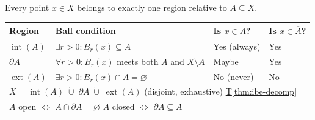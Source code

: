 \begin{tcolorbox}[colback=gray!6, colframe=gray!40, arc=2pt,
  left=8pt, right=8pt, top=6pt, bottom=6pt,
  title={\small\textbf{Part V \enspace Point Classification:
         Interior / Boundary / Exterior}},
  fonttitle=\small\bfseries]
\small
Every point $x \in X$ belongs to exactly one region relative to $A \subseteq X$.
\renewcommand{\arraystretch}{1.55}
\begin{tabular}{p{2.2cm} p{4.4cm} p{2.0cm} p{3.6cm}}
\toprule
\textbf{Region} & \textbf{Ball condition} & \textbf{Is $x \in A$?} & \textbf{Is $x \in \overline{A}$?} \\
\midrule

$\operatorname{int}(A)$
  & $\exists r > 0 : B_r(x) \subseteq A$
  & Yes (always)
  & Yes \\[2pt]

$\partial A$
  & $\forall r > 0 : B_r(x)$ meets both $A$ and $X \setminus A$
  & Maybe
  & Yes \\[2pt]

$\operatorname{ext}(A)$
  & $\exists r > 0 : B_r(x) \cap A = \varnothing$
  & No (never)
  & No \\[2pt]

\midrule
\multicolumn{4}{l}{$X = \operatorname{int}(A) \;\dot\cup\; \partial A \;\dot\cup\; \operatorname{ext}(A)$
\quad (disjoint, exhaustive) \quad \hyperref[thm:ibe-decomp]{T\ref*{thm:ibe-decomp}}} \\[2pt]

\midrule
\multicolumn{4}{l}{
  $A$ open $\iff$ $A \cap \partial A = \varnothing$ \qquad
  $A$ closed $\iff$ $\partial A \subseteq A$
} \\[2pt]

\bottomrule
\end{tabular}
\end{tcolorbox}

\bigskip


